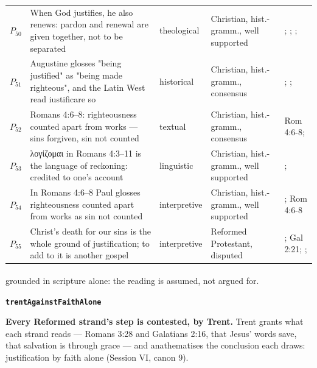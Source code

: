 \documentclass[11pt]{article}
\begin{document}
\begin{longtable}{@{}r >{\raggedright\arraybackslash}p{} l >{\raggedright\arraybackslash}p{} >{\raggedright\arraybackslash}p{}@{}}
$P_{50}$ & When God justifies, he also renews: pardon and renewal are given together, not to be separated & theological & Christian, hist.-gramm., well supported & \cite[§22]{lwf-catholic-joint-declaration-2000}; \cite[Trent, Session VI (1547), Decree on Justification, ch. 7]{tanner-decrees-1990}; \cite[III.xi.6]{calvin-institutes-1960}; \cite{gorman-cruciform-god-2009} \\
$P_{51}$ & Augustine glosses "being justified" as "being made righteous", and the Latin West read iustificare so & historical & Christian, hist.-gramm., consensus & \cite[On the Spirit and the Letter, ch. 45 (26.45)]{npnf1-05-1887}; \cite{mcgrath-iustitia-dei-2005}; \cite[Trent, Session IV (1546), Decree on the Vulgate]{tanner-decrees-1990} \\
$P_{52}$ & Romans 4:6–8: righteousness counted apart from works — sins forgiven, sin not counted & textual & Christian, hist.-gramm., consensus & Rom 4:6-8; \cite[ad loc. Rom 4:6]{moo-romans-1996} \\
$P_{53}$ & λογίζομαι in Romans 4:3–11 is the language of reckoning: credited to one's account & linguistic & Christian, hist.-gramm., well supported & \cite[s.v. λογίζομαι]{bauer-danker-lexicon-2000}; \cite[ad loc. Rom 4:3]{moo-romans-1996} \\
$P_{54}$ & In Romans 4:6–8 Paul glosses righteousness counted apart from works as sin not counted & interpretive & Christian, hist.-gramm., well supported & \cite[ad loc. Rom 4:6]{moo-romans-1996}; Rom 4:6-8 \\
$P_{55}$ & Christ's death for our sins is the whole ground of justification; to add to it is another gospel & interpretive & Reformed Protestant, disputed & \cite[XI.1]{westminster-confession-1647}; Gal 2:21; \cite[ad loc. Gal 2:21]{moo-galatians-2013}; \cite[Epistle to Diognetus 9]{roberts-ante-nicene-fathers-1-1885} \\
\bottomrule
\end{longtable}

\noindent\footnotesize \textsuperscript{\dag} grounded in scripture alone: the reading is assumed, not argued for.
\normalsize

\par\medskip\noindent\textbf{\texttt{trent\allowbreak{}Against\allowbreak{}Faith\allowbreak{}Alone}}\par\nobreak\noindent
\textbf{Every Reformed strand's step is contested, by Trent.} Trent grants what each strand reads — Romans 3:28 and Galatians 2:16, that Jesus' words save, that salvation is through grace — and anathematises the conclusion each draws: justification by faith alone (Session VI, canon 9).
\end{document}
